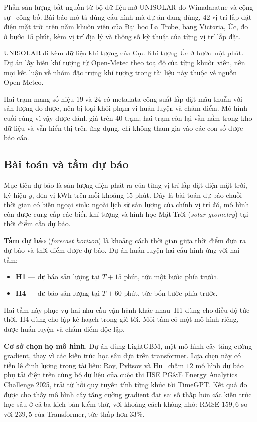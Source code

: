 \documentclass[12pt, a4paper]{report}
\begin{document}
Phần sản lượng bắt nguồn từ bộ dữ liệu mở UNISOLAR do Wimalaratne và cộng
sự~\cite{wimalaratne2022unisolar} công bố. Bài báo mô tả đúng cấu hình mà dự án đang
dùng, $42$ vị trí lắp đặt điện mặt trời trên năm khuôn viên của Đại học La Trobe, bang Victoria,
Úc, đo ở bước $15$ phút, kèm vị trí địa lý và thông số kỹ thuật của từng vị trí lắp đặt.

UNISOLAR đi kèm dữ liệu khí tượng của Cục Khí tượng Úc ở bước một phút. Dự án lấy biến
khí tượng từ Open-Meteo theo toạ độ của từng khuôn viên, nên mọi kết luận về
nhóm đặc trưng khí tượng trong tài liệu này thuộc về nguồn Open-Meteo.

Hai trạm mang số hiệu $19$ và $24$ có metadata công suất lắp đặt mâu thuẫn với
sản lượng đo được, nên bị loại khỏi phạm vi huấn luyện và chấm điểm. Mô hình cuối cùng
vì vậy được đánh giá trên $40$ trạm; hai trạm còn lại vẫn nằm trong kho dữ liệu và vẫn
hiển thị trên ứng dụng, chỉ không tham gia vào các con số được báo cáo.

\FloatBarrier
\subsection{Bài toán và tầm dự báo}

Mục tiêu dự báo là sản lượng điện phát ra của từng vị trí lắp đặt điện mặt trời, ký hiệu
$y$, đơn vị kWh trên mỗi khoảng $15$ phút. Đây là bài toán dự báo chuỗi thời gian có
biến ngoại sinh: ngoài lịch sử sản lượng của chính vị trí đó, mô hình còn được cung cấp
các biến khí tượng và hình học Mặt Trời (\textit{solar geometry}) tại thời điểm cần dự báo.

\textbf{Tầm dự báo} (\textit{forecast horizon}) là khoảng cách thời gian giữa thời
điểm đưa ra dự báo và thời điểm được dự báo. Dự án huấn luyện hai cấu hình ứng với hai
tầm:

\begin{itemize}
    \item \textbf{H1} --- dự báo sản lượng tại $T + 15$ phút, tức một bước phía trước.
    \item \textbf{H4} --- dự báo sản lượng tại $T + 60$ phút, tức bốn bước phía trước.
\end{itemize}

Hai tầm này phục vụ hai nhu cầu vận hành khác nhau: H1 dùng cho điều độ tức thời, H4
dùng cho lập kế hoạch trong giờ tới. Mỗi tầm có một mô hình riêng, được huấn luyện và
chấm điểm độc lập.

\textbf{Cơ sở chọn họ mô hình.} Dự án dùng LightGBM, một mô hình cây tăng cường
gradient, thay vì các kiến trúc học sâu dựa trên transformer. Lựa chọn này có tiền
lệ định lượng trong tài liệu: Roy, Pyltsov và Hu~\cite{roy2025hourly} chấm $12$ mô hình
dự báo phụ tải điện trên cùng bộ dữ liệu của cuộc thi IISE PG\&E Energy Analytics
Challenge 2025, trải từ hồi quy tuyến tính từng khúc tới TimeGPT. Kết quả đo được cho
thấy mô hình cây tăng cường gradient đạt sai số thấp hơn các kiến trúc học sâu ở cả ba
kịch bản kiểm thử, với khoảng cách không nhỏ: RMSE $159{,}6$ so với $239{,}5$ của
Transformer, tức thấp hơn $33\%$.
\end{document}
